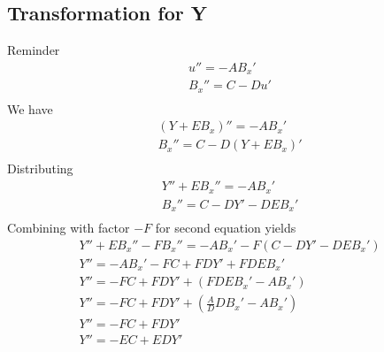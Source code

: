 \documentclass[11pt]{article}
\begin{document}
\subsection{Transformation for Y}
Reminder
\begin{equation}\begin{aligned}
u''   = - A B_x' \\
B_x'' = C - D u' \\
\end{aligned} \end{equation}
We have
\begin{equation}\begin{aligned}
(Y + E B_x)''   = - A B_x' \\
B_x'' = C - D (Y + E B_x)' \\
\end{aligned} \end{equation}
Distributing
\begin{equation}\begin{aligned}
Y'' + E B_x''   = - A B_x' \\
B_x'' = C - D Y' - D E B_x' \\
\end{aligned} \end{equation}
Combining with factor $-F$ for second equation yields
\begin{equation}\begin{aligned}
Y'' + E B_x'' - FB_x''   = - A B_x' - F(C - D Y' - D E B_x') \\
Y'' = - A B_x' - FC + F D Y' + F D E B_x' \\
Y'' = - FC + F D Y' + (F D E B_x' - A B_x') \\
Y'' = - FC + F D Y' + \left(\frac{A}{D} D B_x' - A B_x' \right) \\
Y'' = - FC + F D Y' \\
Y'' = - EC + E D Y' \\
\end{aligned} \end{equation}
\end{document}
